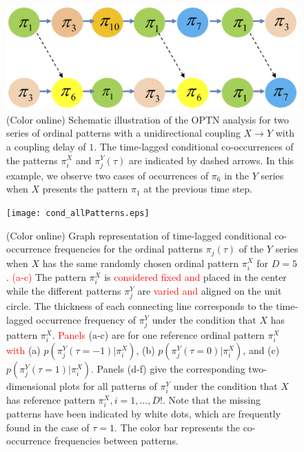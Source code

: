 \documentclass[12pt,aip,cha,reprint,nofootinbib]{revtex4-1}
\begin{document}
\begin{figure}
	\centering
	\includegraphics[width=\columnwidth]{patternSeriesCondition.eps}
\caption{(Color online) Schematic illustration of the OPTN analysis for two series of ordinal patterns with a unidirectional coupling $X \to Y$ with a coupling delay of $1$. The time-lagged conditional co-occurrences of the patterns $\pi_i^{X}$ and $\pi_{j}^{Y}(\tau)$ are indicated by dashed arrows. In this example, we observe two cases of occurrences of $\pi_6$ in the $Y$ series when $X$ presents the pattern $\pi_1$ at the previous time step.  \label{fig:patternSeriesCond}}
\end{figure}

\begin{figure}
	\centering
 	\texttt{[image: cond\_allPatterns.eps]}
\caption{(Color online) Graph representation of time-lagged conditional co-occurrence frequencies for the ordinal patterns $\pi_{j}(\tau)$ of the $Y$ series when $X$ has the same randomly chosen ordinal pattern $\pi_i^{X}$ for $D = 5$. \textcolor{red}{(a-c)} The pattern $\pi_i^{X}$ is \textcolor{red}{considered fixed and} placed in the center while the different patterns $\pi_{j}^{Y}$ are \textcolor{red}{varied and} aligned on the unit circle. The thickness of each connecting line corresponds to the time-lagged occurrence frequency of $\pi_j^{Y}$ under the condition that $X$ has pattern $\pi_i^{X}$. \textcolor{red}{Panels} (a-c) are for one reference ordinal pattern $\pi_i^{X}$ \textcolor{red}{with} (a) $p(\pi_{j}^{Y}(\tau=-1) | \pi_{i}^{X}) $, (b) $p(\pi_j^{Y}(\tau=0) | \pi_i^{X})$, and (c) $p(\pi_{j}^{Y}(\tau=1) | \pi_i^{X})$. Panels (d-f) give the corresponding two-dimensional plots for all patterns of $\pi_i^{Y}$ under the condition that $X$ has reference pattern $\pi_i^{X}, i = 1, \dots, D!$. Note that the missing patterns have been indicated by white dots, which are frequently found in the case of $\tau = 1$. The color bar represents the co-occurrence frequencies between patterns. 
\label{fig:conditionTranOP}}
\end{figure}
\end{document}
